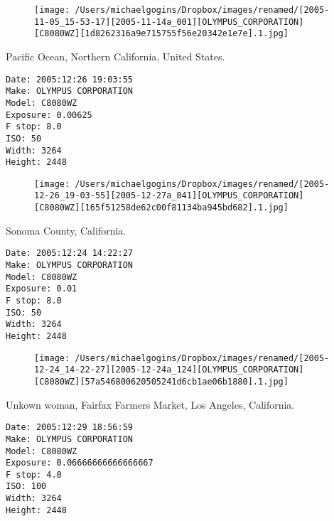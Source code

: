 \documentclass[11pt,letter,DIV=14,paper=landscape]{scrbook}
\begin{document}
\begin{figure}
\texttt{[image: /Users/michaelgogins/Dropbox/images/renamed/[2005-11-05\_15-53-17][2005-11-14a\_001][OLYMPUS\_CORPORATION][C8080WZ][1d8262316a9e715755f56e20342e1e7e].1.jpg]}
\end{figure}
    
\clearpage
\noindent Pacific Ocean, Northern California, United States.
\noindent
\begin{lstlisting}
Date: 2005:12:26 19:03:55
Make: OLYMPUS CORPORATION
Model: C8080WZ
Exposure: 0.00625
F stop: 8.0
ISO: 50
Width: 3264
Height: 2448
\end{lstlisting}
\clearpage

\begin{figure}
\texttt{[image: /Users/michaelgogins/Dropbox/images/renamed/[2005-12-26\_19-03-55][2005-12-27a\_041][OLYMPUS\_CORPORATION][C8080WZ][165f51258de62c00f81134ba945bd682].1.jpg]}
\end{figure}
    
\clearpage
\noindent Sonoma County, California.
\noindent
\begin{lstlisting}
Date: 2005:12:24 14:22:27
Make: OLYMPUS CORPORATION
Model: C8080WZ
Exposure: 0.01
F stop: 8.0
ISO: 50
Width: 3264
Height: 2448
\end{lstlisting}
\clearpage

\begin{figure}
\texttt{[image: /Users/michaelgogins/Dropbox/images/renamed/[2005-12-24\_14-22-27][2005-12-24a\_124][OLYMPUS\_CORPORATION][C8080WZ][57a546800620505241d6cb1ae06b1880].1.jpg]}
\end{figure}
    
\clearpage
\noindent Unkown woman, Fairfax Farmers Market, Los Angeles, California.
\noindent
\begin{lstlisting}
Date: 2005:12:29 18:56:59
Make: OLYMPUS CORPORATION
Model: C8080WZ
Exposure: 0.06666666666666667
F stop: 4.0
ISO: 100
Width: 3264
Height: 2448
\end{lstlisting}
\clearpage
\end{document}
